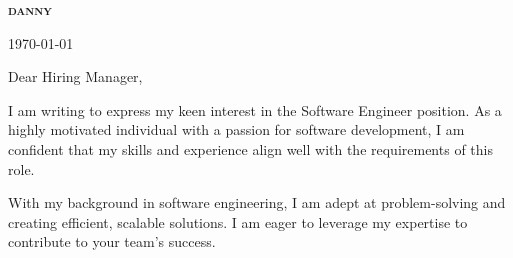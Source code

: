 \documentclass[letterpaper,11pt]{article}
\begin{document}
\begin{center}
\textbf{\Huge \scshape danny} \\ \vspace{1pt}
\end{center}

\today
\vspace{20pt}

\vspace{20pt}

Dear Hiring Manager, \\
\vspace{10pt}

I am writing to express my keen interest in the Software Engineer position. As a highly motivated individual with a passion for software development, I am confident that my skills and experience align well with the requirements of this role.
\vspace{10pt}

With my background in software engineering, I am adept at problem-solving and creating efficient, scalable solutions. I am eager to leverage my expertise to contribute to your team's success.
\vspace{10pt}
\end{document}
